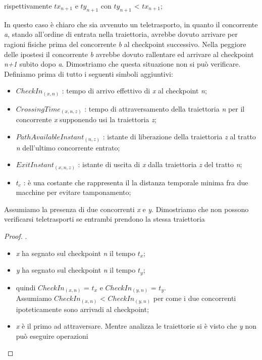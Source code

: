 \begin{itemize}
\begin{itemize}
rispettivamente \emph{$tx_{n+1}$} e \emph{$ty_{n+1}$} con \emph{$ty_{n+1}$} < \emph{$tx_{n+1}$};
\end{itemize}
In questo caso è chiaro che sia avvenuto un teletrasporto, in quanto il concorrente \emph{a}, stando all'ordine di entrata nella
traiettoria, avrebbe dovuto arrivare per ragioni fisiche prima del concorrente \emph{b} al checkpoint successivo. Nella peggiore 
delle ipostesi il concorrente \emph{b} avrebbe dovuto rallentare ed arrivare al checkpoint \emph{n+1} subito dopo \emph{a}. 
Dimostriamo che questa situazione non si può verificare. Definiamo prima di tutto i seguenti simboli aggiuntivi:
\begin{itemize}
\item $CheckIn_{(x,n)}$ : tempo di arrivo effettivo di \emph{x} al checkpoint \emph{n};
\item $CrossingTime_{(x,n,z)}$ : tempo di attraversamento della traiettoria \emph{n} per il concorrente \emph{x} supponendo usi la traiettoria
\emph{z}; 
\item $PathAvailableInstant_{(n,z)}$ : istante di liberazione della traiettoria \emph{z} al tratto \emph{n} dell'ultimo concorrente entrato;
\item $ExitInstant_{(x,n,z)}$ : istante di uscita di \emph{x} dalla traiettoria \emph{z} del tratto \emph{n};
\item $t_c$ : è una costante che rappresenta il la distanza temporale minima fra due macchine per evitare tamponamento;
\end{itemize}
Assumiamo la presenza di due concorrenti \emph{x} e \emph{y}. Dimostriamo che non possono verificarsi teletrasporti se entrambi
prendono la stessa traiettoria
\begin{proof}.
\begin{itemize}
\item \emph{x} ha segnato sul checkpoint \emph{n} il tempo \emph{$t_x$};
\item \emph{y} ha segnato sul checkpoint \emph{n} il tempo \emph{$t_y$};
\item quindi $CheckIn_{(x,n)}$ = $t_x$ e $CheckIn_{(y,n)}$ = $t_y$. 
\\Assumiamo $CheckIn_{(x,n)}$ < $CheckIn_{(y,n)}$ per come i due concorrenti
ipoteticamente sono arrivadi al checkpoint;
\item \emph{x} è il primo ad attraversare. Mentre analizza le traiettorie si è visto che \emph{y} non può eseguire operazioni

\end{itemize}
\end{proof}
\end{itemize}
